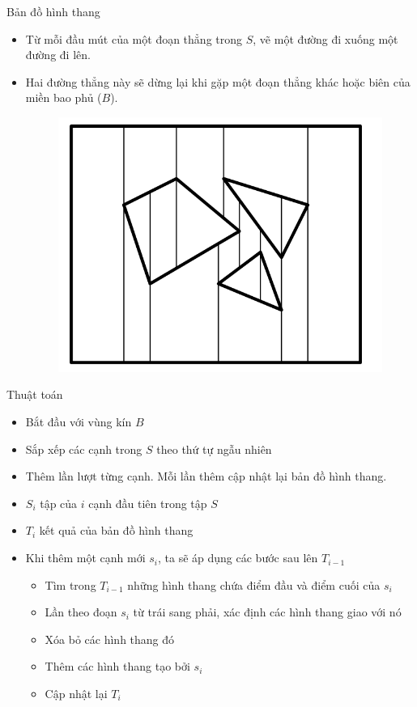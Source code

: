 \documentclass[compress]{beamer}
\begin{document}
\begin{frame}{Bản đồ hình thang}
\begin{itemize}
\item Từ mỗi đầu mút của một đoạn thẳng trong $S$, vẽ một đường đi xuống một đường đi lên. 
\item Hai đường thẳng này sẽ dừng lại khi gặp một đoạn thẳng khác hoặc biên của miền bao phủ ($B$).
\begin{figure}[H]
\centering
\includegraphics[scale=0.2]{trmap.png}
\end{figure}
\end{itemize}
\end{frame}

\begin{frame}{Thuật toán}
\begin{itemize}
\item Bắt đầu với vùng kín $B$
\item Sắp xếp các cạnh trong $S$ theo thứ tự ngẫu nhiên
\item Thêm lần lượt từng cạnh. Mỗi lần thêm cập nhật lại bản đồ hình thang.
\item $S_i$ tập của $i$ cạnh đầu tiên trong tập $S$
\item[] $T_i$ kết quả của bản đồ hình thang
\item Khi thêm một cạnh mới $s_i$, ta sẽ áp dụng các bước sau lên $T_{i-1}$
\begin{itemize}
\item Tìm trong $T_{i-1}$ những hình thang chứa điểm đầu và điểm cuối của $s_i$
\item Lần theo đoạn $s_i$ từ trái sang phải, xác định các hình thang giao với nó
\item Xóa bỏ các hình thang đó
\item Thêm các hình thang tạo bởi $s_i$
\item Cập nhật lại $T_i$
\end{itemize}
\end{itemize}
\end{frame}
\end{document}
